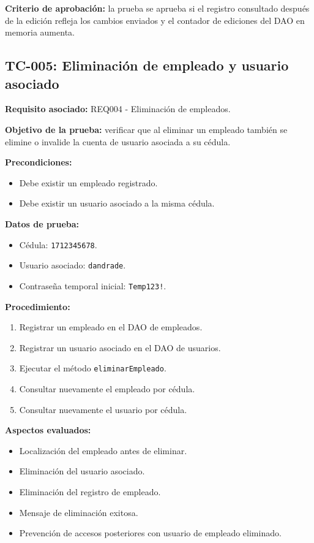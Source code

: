 \documentclass[12pt,a4paper]{article}
\begin{document}
\textbf{Criterio de aprobación:} la prueba se aprueba si el registro consultado después de la edición refleja los cambios enviados y el contador de ediciones del DAO en memoria aumenta.

\subsection{TC-005: Eliminación de empleado y usuario asociado}

\textbf{Requisito asociado:} REQ004 - Eliminación de empleados.

\textbf{Objetivo de la prueba:} verificar que al eliminar un empleado también se elimine o invalide la cuenta de usuario asociada a su cédula.

\textbf{Precondiciones:}
\begin{itemize}[leftmargin=*]
    \item Debe existir un empleado registrado.
    \item Debe existir un usuario asociado a la misma cédula.
\end{itemize}

\textbf{Datos de prueba:}
\begin{itemize}[leftmargin=*]
    \item Cédula: \texttt{1712345678}.
    \item Usuario asociado: \texttt{dandrade}.
    \item Contraseña temporal inicial: \texttt{Temp123!}.
\end{itemize}

\textbf{Procedimiento:}
\begin{enumerate}[leftmargin=*]
    \item Registrar un empleado en el DAO de empleados.
    \item Registrar un usuario asociado en el DAO de usuarios.
    \item Ejecutar el método \texttt{eliminarEmpleado}.
    \item Consultar nuevamente el empleado por cédula.
    \item Consultar nuevamente el usuario por cédula.
\end{enumerate}

\textbf{Aspectos evaluados:}
\begin{itemize}[leftmargin=*]
    \item Localización del empleado antes de eliminar.
    \item Eliminación del usuario asociado.
    \item Eliminación del registro de empleado.
    \item Mensaje de eliminación exitosa.
    \item Prevención de accesos posteriores con usuario de empleado eliminado.
\end{itemize}
\end{document}
